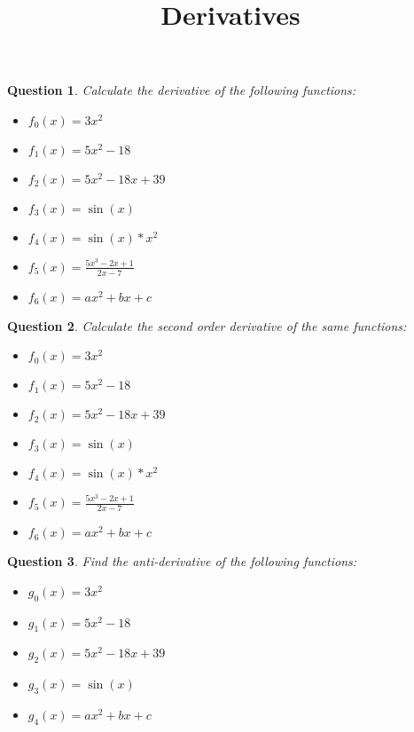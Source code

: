 \documentclass[a4paper]{article}
\title{Derivatives}
\author{}
\date{}
\newtheorem{question}{Question}
\begin{document}
	
	\maketitle
	
	
	\begin{question}
		Calculate the derivative of the following functions:\\
		\begin{itemize}
			\item $f_0(x) = 3x^2$
			\item $f_1(x) = 5x^2-18$
			\item $f_2(x) = 5x^2-18x+39$
			\item $f_3(x) = \sin(x)$
			\item $f_4(x) = \sin(x)*x^2$
			\item $f_5(x) = \frac{5x^3-2x+1}{2x-7}$
			\item $f_6(x) = ax^2+bx+c$
		\end{itemize}
	\end{question}
	
	\begin{question}
		Calculate the second order derivative of the same functions:\\
		\begin{itemize}
			\item $f_0(x) = 3x^2$
			\item $f_1(x) = 5x^2-18$
			\item $f_2(x) = 5x^2-18x+39$
			\item $f_3(x) = \sin(x)$
			\item $f_4(x) = \sin(x)*x^2$
			\item $f_5(x) = \frac{5x^3-2x+1}{2x-7}$
			\item $f_6(x) = ax^2+bx+c$
		\end{itemize}
	\end{question}
	
	\begin{question}
		Find the anti-derivative of the following functions:\\
		\begin{itemize}
			\item $g_0(x) = 3x^2$
			\item $g_1(x) = 5x^2-18$
			\item $g_2(x) = 5x^2-18x+39$
			\item $g_3(x) = \sin(x)$
			\item $g_4(x) = ax^2+bx+c$
		\end{itemize}
	\end{question}
	
\end{document}
